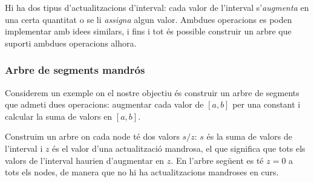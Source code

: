 Hi ha dos tipus d'actualitzacions d'interval: cada valor de l'interval
s'\emph{augmenta} en una certa quantitat o se li \emph{assigna} algun
valor. Ambdues operacions es poden implementar amb idees similars, i
fins i tot és possible construir un arbre que suporti ambdues
operacions alhora.

\subsubsection{Arbre de segments mandrós}

Considerem un exemple on el nostre objectiu és construir un arbre de
segments que admeti dues operacions: augmentar cada valor de $[a,b]$
per una constant i calcular la suma de valors en $[a,b]$.

Construim un arbre on cada node té dos valors $s/z$: $s$ és
la suma de valors de l'interval i $z$ és el valor d'una
actualització mandrosa, el que significa que tots els valors de
l'interval haurien d'augmentar en $z$. En l'arbre següent es té $z=0$ a
tots els nodes, de manera que no hi ha actualitzacions mandroses en
curs.
